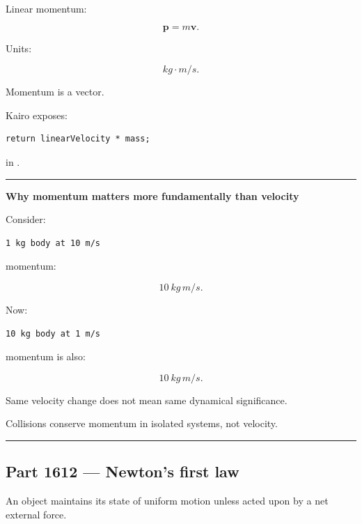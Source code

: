 \hypertarget{06-engine-ii-ch034-part-1611-linear-momentum}{}

Linear momentum:

\[
\boxed{
\mathbf{p}=m\mathbf{v}.
}
\]

Units:

\[
kg\cdot m/s.
\]

Momentum is a vector.

Kairo exposes:

\begin{verbatim}
return linearVelocity * mass;
\end{verbatim}

in .

\begin{center}\rule{0.5\linewidth}{0.5pt}\end{center}

\textbf{Why momentum matters more fundamentally than velocity}

Consider:

\begin{verbatim}
1 kg body at 10 m/s
\end{verbatim}

momentum:

\[
10\ kg\,m/s.
\]

Now:

\begin{verbatim}
10 kg body at 1 m/s
\end{verbatim}

momentum is also:

\[
10\ kg\,m/s.
\]

Same velocity change does not mean same dynamical significance.

Collisions conserve momentum in isolated systems, not velocity.

\begin{center}\rule{0.5\linewidth}{0.5pt}\end{center}

\subsection{Part 1612 --- Newton's first law}\label{06-engine-ii-ch034-part-1612-newtons-first-law}

\hypertarget{06-engine-ii-ch034-part-1612-newtons-first-law}{}

An object maintains its state of uniform motion unless acted upon by a net external force.

